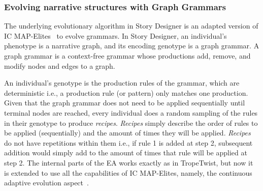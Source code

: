




\subsubsection{Evolving narrative structures with Graph Grammars}

The underlying evolutionary algorithm in Story Designer is an adapted version of IC MAP-Elites~\cite{p11alvarez_interactive_2020} to evolve grammars. In Story Designer, an individual's phenotype is a narrative graph, and its encoding genotype is a graph grammar. A graph grammar is a context-free grammar whose productions add, remove, and modify nodes and edges to a graph. 

An individual's genotype is the production rules of the grammar, which are deterministic i.e., a production rule (or pattern) only matches one production. Given that the graph grammar does not need to be applied sequentially until terminal nodes are reached, every individual does a random sampling of the rules in their genotype to produce \emph{recipes}. \emph{Recipes} simply describe the order of rules to be applied (sequentially) and the amount of times they will be applied. \emph{Recipes} do not have repetitions within them i.e., if rule 1 is added at step 2, subsequent addition would simply add to the amount of times that rule will be applied at step 2. The internal parts of the EA works exactly as in TropeTwist, but now it is extended to use all the capabilities of IC MAP-Elites, namely, the continuous adaptive evolution aspect~\cite{p11alvarez_tropetwist_2022,alvarez_interactive_2020}.

%


